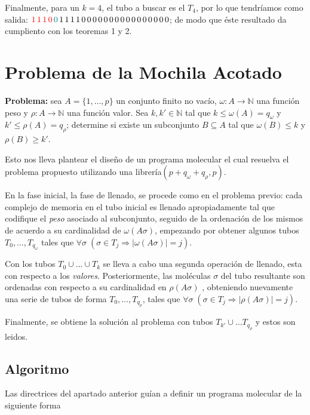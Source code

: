 \documentclass[12pt, letterpaper, twoside]{article}
\begin{document}
    Finalmente, para un $k=4$, el tubo a buscar es el $T_4$, por lo que tendríamos como salida: $\textcolor{red}{1\,1\,1\,0}\textcolor{teal}{\,0}\,1\,1\,1\,1\,0\,0\,0\,0\,0\,0\,0\,0\,0\,0\,0\,0\,0\,0\,0\,0$; de modo que éste resultado da cumpliento  con los teoremas 1 y 2.


    \newpage
    \section{Problema de la Mochila Acotado}
    \textbf{Problema:} sea $A=\{1,\dots,p\}$ un conjunto finito no vacío, $\omega:A\rightarrow\mathbb{N}$ una función peso y $\rho:A\rightarrow\mathbb{N}$ una función valor. Sea $k, k'\in\mathbb{N}$ tal que $k\leq\omega(A)=q_\omega$ y $k'\leq\rho(A)=q_\rho$; determine si existe un subconjunto $B\subseteq A$ tal que $\omega(B)\leq k$ y $\rho(B)\geq k'$.


    Esto nos lleva plantear el diseño de un programa molecular el cual resuelva el problema propuesto utilizando una librería$(p+q_\omega+q_\rho, p)$.


    En la fase inicial, la fase de llenado, se procede como en el problema previo: cada complejo de memoria en el tubo inicial es llenado apropiadamente tal que codifique el \emph{peso} asociado al subconjunto, seguido de la ordenación de los mismos de acuerdo a su cardinalidad de $\omega(A\sigma)$, empezando por obtener algunos tubos $T_0,\dots,T_{q_\omega}$ tales que $\forall\sigma\;(\sigma\in T_j \Rightarrow |\omega(A\sigma)|=j)$.


    Con los tubos $T_0\cup\dots\cup T_k$ se lleva a cabo una segunda operación de llenado, esta con respecto a los \emph{valores}. Posteriormente, las moléculas $\sigma$ del tubo resultante son ordenadas con respecto a su cardinalidad en $\rho(A\sigma)$ , obteniendo nuevamente una serie de tubos de forma $T_0,\dots,T_{q_\rho}$, tales que $\forall\sigma\;(\sigma\in T_j \Rightarrow |\rho(A\sigma)| = j)$.


    Finalmente, se obtiene la solución al problema con tubos $T_{k'}\cup\dots T_{q_\rho}$ y estos son leidos.
    \newpage
    \subsection{Algoritmo}
    Las directrices del apartado anterior guían a definir un programa molecular de la siguiente forma
\end{document}
